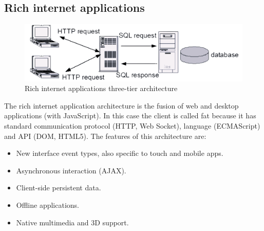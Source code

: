 \documentclass[12pt, a4paper]{report}
\begin{document}
    \subsection{Rich internet applications}
    \begin{figure}[H]
        \centering
        \includegraphics[width=0.5\linewidth]{images/ttria.png}
        \caption{Rich internet applications three-tier architecture}
    \end{figure}
    The rich internet application architecture is the fusion of web and desktop applications (with JavaScript). 
    In this case the client is called fat because it has standard communication protocol (HTTP, Web Socket), language (ECMAScript) and API (DOM, HTML5). 
    The features of this architecture are: 
    \begin{itemize}
        \item New interface event types, also specific to touch and mobile apps.
        \item Asynchronous interaction (AJAX).
        \item Client-side persistent data.
        \item Offline applications.
        \item Native multimedia and 3D support.
    \end{itemize}
\end{document}
